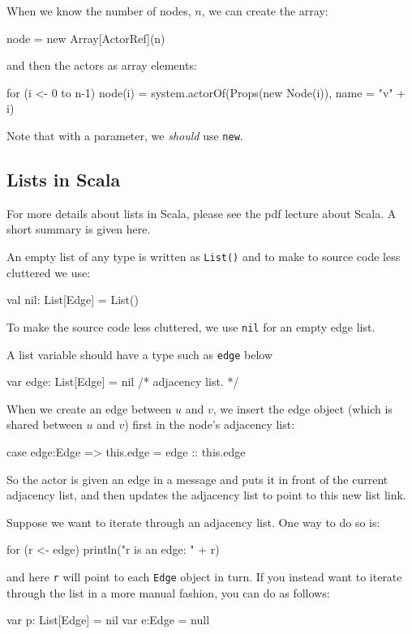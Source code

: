 \documentclass{forsete}
\begin{document}
{\noindent When we know the number of nodes, $n$, we can create the array:
\begin{ccode}
node = new Array[ActorRef](n)
\end{ccode}

\noindent and then the actors as array elements:

\begin{ccode}
for (i <- 0 to n-1)
	node(i) = system.actorOf(Props(new Node(i)), name = "v" + i)
\end{ccode}
Note that with a parameter, we {\em should} use \verb.new..

\subsection*{Lists in Scala}
For more details about lists in Scala, please see the pdf lecture about Scala.
A short summary is given here.

An empty list of any type is written as \verb.List(). and to make to source
code less cluttered we use:
\begin{ccode}
val	nil: List[Edge] = List()
\end{ccode}
To make the source code less cluttered, we use \verb.nil. for an empty edge list.

A list variable should have a type such as \verb.edge. below
\begin{ccode}
var	edge: List[Edge] = nil		/* adjacency list. */
\end{ccode}

When we create an edge between $u$ and $v$, we insert the edge object (which is shared between $u$ and $v$)
first in the node's adjacency list:
\begin{ccode}
case edge:Edge => { this.edge = edge :: this.edge }
\end{ccode}

So the actor is given an edge in a message and puts it in front of the current adjacency list, and
then updates the adjacency list to point to this new list link.

Suppose we want to iterate through an adjacency list. One way to do so is:
\begin{ccode}
for (r <- edge)
	println("r is an edge: " + r)
\end{ccode}
and here \verb.r. will point to each \verb.Edge. object in turn.
If you instead want to iterate through the list in a more manual fashion, you can do as follows:
\begin{ccode}
var	p: List[Edge]	= nil
var	e:Edge		= null


\end{ccode}}
\end{document}
